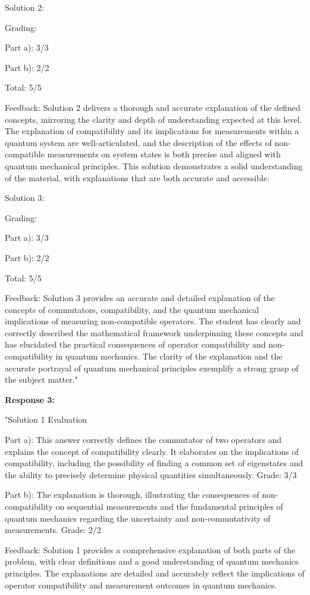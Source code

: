 \documentclass[a4paper,11pt]{article}
\begin{document}
Solution 2:

Grading:

Part a): 3/3

Part b): 2/2

Total: 5/5

Feedback:
Solution 2 delivers a thorough and accurate explanation of the defined concepts, mirroring the clarity and depth of understanding expected at this level. The explanation of compatibility and its implications for measurements within a quantum system are well-articulated, and the description of the effects of non-compatible measurements on system states is both precise and aligned with quantum mechanical principles. This solution demonstrates a solid understanding of the material, with explanations that are both accurate and accessible.

Solution 3:

Grading:

Part a): 3/3

Part b): 2/2

Total: 5/5

Feedback:
Solution 3 provides an accurate and detailed explanation of the concepts of commutators, compatibility, and the quantum mechanical implications of measuring non-compatible operators. The student has clearly and correctly described the mathematical framework underpinning these concepts and has elucidated the practical consequences of operator compatibility and non-compatibility in quantum mechanics. The clarity of the explanation and the accurate portrayal of quantum mechanical principles exemplify a strong grasp of the subject matter."

\textbf{Response 3:}

"Solution 1 Evaluation

Part a): This answer correctly defines the commutator of two operators and explains the concept of compatibility clearly. It elaborates on the implications of compatibility, including the possibility of finding a common set of eigenstates and the ability to precisely determine physical quantities simultaneously. Grade: 3/3

Part b): The explanation is thorough, illustrating the consequences of non-compatibility on sequential measurements and the fundamental principles of quantum mechanics regarding the uncertainty and non-commutativity of measurements. Grade: 2/2

Feedback: Solution 1 provides a comprehensive explanation of both parts of the problem, with clear definitions and a good understanding of quantum mechanics principles. The explanations are detailed and accurately reflect the implications of operator compatibility and measurement outcomes in quantum mechanics.
\end{document}
